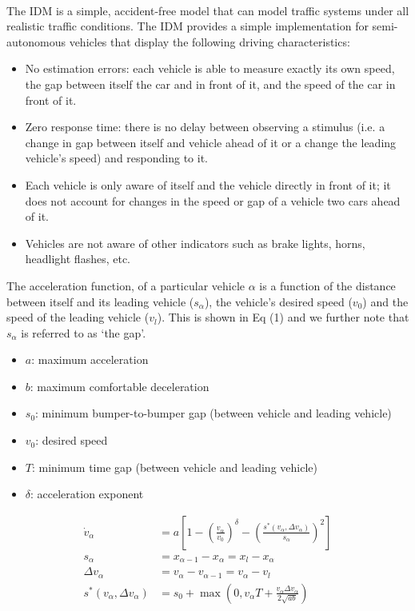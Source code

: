 \documentclass[12pt]{article}
\begin{document}
\paragraph{}
The IDM is a simple, accident-free model that can model traffic systems under all realistic traffic conditions. The IDM provides a simple implementation for semi-autonomous vehicles that display the following driving characteristics:
\begin{itemize}
  \item No estimation errors: each vehicle is able to measure exactly its own speed, the gap between itself the car and in front of it, and the speed of the car in front of it.
  \item Zero response time: there is no delay between observing a stimulus (i.e. a change in gap between itself and vehicle ahead of it or a change the leading vehicle's speed) and responding to it.
  \item Each vehicle is only aware of itself and the vehicle directly in front of it; it does not account for changes in the speed or gap of a vehicle two cars ahead of it.
  \item Vehicles are not aware of other indicators such as brake lights, horns, headlight flashes, etc.
\end{itemize}
The acceleration function, of a particular vehicle $\alpha$ is a function of the distance between itself and its leading vehicle ($s_\alpha$), the vehicle's desired speed ($v_0$) and the speed of the leading vehicle ($v_l$). This is shown in Eq (1) and we further note that $s_\alpha$ is referred to as `the gap'. \cite[Chapter~11]{treiber_kesting_2013}
\begin{mymathbox}[title=IDM Parameters, colframe=blue!30!black]
  \begin{itemize}
    \item $a$: maximum acceleration
    \item $b$: maximum comfortable deceleration
    \item $s_0$: minimum bumper-to-bumper gap (between vehicle and leading vehicle)
    \item $v_0$: desired speed
    \item $T$: minimum time gap (between vehicle and leading vehicle)
    \item $\delta$: acceleration exponent
  \end{itemize}
\end{mymathbox}

\begin{mymathbox}[ams gather, title=IDM Governing Equations, colframe=blue!30!black]
  \begin{align}
  \dot{v}_\alpha &= a \left[1 - \left(\frac{v_\alpha}{v_0}\right)^{\delta} - \left(\frac{s^*(v_\alpha,\Delta v_\alpha)}{s_\alpha}\right)^{2}\right]\\
  s_\alpha &= x_{\alpha-1}-x_\alpha=x_{l}-x_\alpha\\
  \Delta v_\alpha &=v_\alpha-v_{\alpha-1}=v_\alpha-v_l\\
  s^*(v_\alpha, \Delta v_\alpha) &= s_0 + \max\left(0, v_\alpha T + \frac{v_\alpha \Delta v_\alpha}{2 \sqrt{ab}} \right)
  \end{align}
\end{mymathbox}
\end{document}
